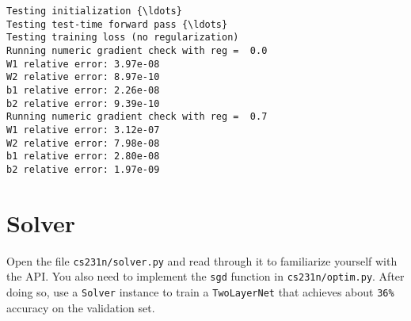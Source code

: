 \documentclass[11pt]{article}
\begin{document}
    \begin{Verbatim}[commandchars=\\\{\}]
Testing initialization {\ldots}
Testing test-time forward pass {\ldots}
Testing training loss (no regularization)
Running numeric gradient check with reg =  0.0
W1 relative error: 3.97e-08
W2 relative error: 8.97e-10
b1 relative error: 2.26e-08
b2 relative error: 9.39e-10
Running numeric gradient check with reg =  0.7
W1 relative error: 3.12e-07
W2 relative error: 7.98e-08
b1 relative error: 2.80e-08
b2 relative error: 1.97e-09
    \end{Verbatim}

    \hypertarget{solver}{%
\section{Solver}\label{solver}}

Open the file \texttt{cs231n/solver.py} and read through it to
familiarize yourself with the API. You also need to implement the
\texttt{sgd} function in \texttt{cs231n/optim.py}. After doing so, use a
\texttt{Solver} instance to train a \texttt{TwoLayerNet} that achieves
about \texttt{36\%} accuracy on the validation set.
\end{document}
